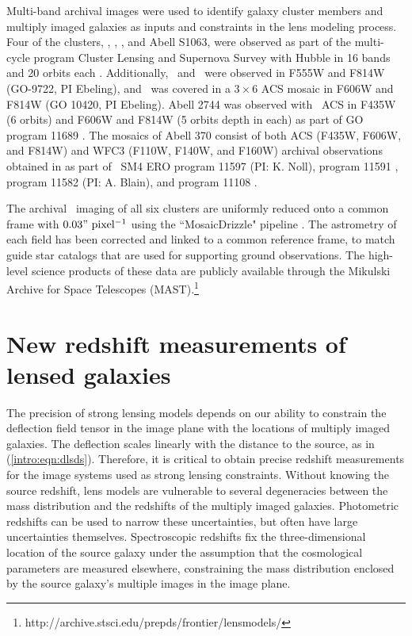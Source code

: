 Multi-band archival images were used to identify galaxy cluster members and multiply imaged galaxies as inputs and constraints in the lens modeling process.  Four of the clusters, \MACSzerofour, \MACSzeroseven, \MACSeleven, and Abell S1063, were observed as part of the multi-cycle program Cluster Lensing and Supernova Survey with Hubble in 16 bands and 20 orbits each \citep[CLASH; PI: M. Postman; see][]{Postman:2012lr}. Additionally, \MACSzeroseven\ and \MACSeleven\ were observed in F555W and F814W (GO-9722, PI Ebeling), and \MACSzeroseven\ was covered in a $3\times6$ ACS mosaic in F606W and F814W (GO 10420, PI Ebeling). Abell 2744 was observed with \hst\ ACS in F435W (6 orbits) and F606W and F814W (5 orbits depth in each) as part of GO program 11689 \citep[PI: R. Dupke; ][]{Merten:2011fk}. The mosaics of Abell 370 consist of both ACS (F435W, F606W, and F814W) and WFC3 (F110W, F140W, and F160W) archival observations obtained in  as part of \hst\ SM4 ERO program 11597 (PI: K. Noll), program 11591 \citep[PI: J.-P. Kneib;][]{Richard:2010wd}, program 11582 (PI: A. Blain), and program 11108 \citep[PI. E. Hu; ][]{Cowie:2011lr}. 

The archival \hst\ imaging of all six clusters are uniformly reduced onto a common frame with $0.03"\ \mathrm{pixel^{-1}}$ using the ``MosaicDrizzle" pipeline \citep[Koekemoer et al 2002, ][for further details]{Koekemoer:2011fk}. The astrometry of each field has been corrected and linked to a common reference frame, to match guide star catalogs that are used for supporting ground observations. The high-level science products of these data are publicly available through the Mikulski Archive for Space Telescopes (MAST).\footnote{http://archive.stsci.edu/prepds/frontier/lensmodels/}

\section{New redshift measurements of lensed galaxies}
\label{chap2:sec:magellan}

The precision of strong lensing models depends on our ability to constrain the deflection field tensor in the image plane with the locations of multiply imaged galaxies. The deflection scales linearly with the distance to the source, as in (\ref{intro:eqn:dlsds}). Therefore, it is critical to obtain precise redshift measurements for the image systems used as strong lensing constraints. Without knowing the source redshift, lens models are vulnerable to several degeneracies between the mass distribution and the redshifts of the multiply imaged galaxies. Photometric redshifts can be used to narrow these uncertainties, but often have large uncertainties themselves. Spectroscopic redshifts fix the three-dimensional location of the source galaxy under the assumption that the cosmological parameters are measured elsewhere, constraining the mass distribution enclosed by the source galaxy's multiple images in the image plane.

